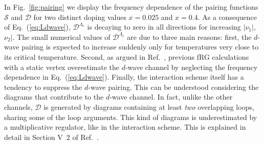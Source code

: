 \begin{widetext}
In Fig.~\ref{fig:pairing} we display the frequency dependence of the pairing functions $\mathcal{S}$ and $\mathcal{D}$ for two distinct doping values $x=0.025$ and $x=0.4$. 
As a consequence of Eq.~(\ref{eq:Ldwave}), $\mathcal{D}^{\Lambda_c}$ is decaying to zero in all directions for increasing $|\nu_1|$, $\nu_2|$.\cite{Wentzell2016a}
The small numerical values of $\mathcal{D}^{\Lambda_c}$ are due to three main reasons: 
first, the $d$-wave pairing is expected to increase suddenly only for temperatures very close to its critical temperature. 
Second, as argued in Ref.~, previous fRG calculations with a static vertex overestimate the $d$-wave channel by neglecting the frequency dependence in Eq.~(\ref{eq:Ldwave}). 
Finally, the interaction scheme itself has a tendency to suppress the $d$-wave pairing. 
This can be understood considering the diagrams that contribute to the $d$-wave channel. In fact, unlike the other channels, $\mathcal{D}$ is generated by diagrams containing at least \emph{two} overlapping loops, sharing some of the loop arguments. This kind of diagrams is underestimated by a multiplicative regulator, like in the interaction scheme.  
This is explained in detail in Section V~2 of Ref.~.

\end{widetext}